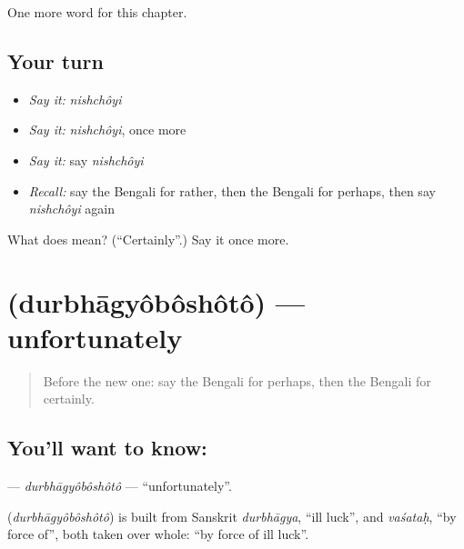 \begin{grammarlens}[title={What you've built}]
One more word for this chapter.
\end{grammarlens}

\subsection*{Your turn}
\begin{itemize}
\raggedright
  \item \emph{Say it:} \emph{nishchôyi}
  \item \emph{Say it:} \emph{nishchôyi}, once more
  \item \emph{Say it:} say \emph{nishchôyi}
  \item \emph{Recall:} say the Bengali for rather, then the Bengali for perhaps, then say \emph{nishchôyi} again
\end{itemize}

\begin{tcolorbox}[breakable,colback=teal!4,colframe=teal!35!black,title={Before you move on}]
What does  mean? (\textquotedblleft{}Certainly\textquotedblright{}.) Say it once more.
\end{tcolorbox}
\section[\texorpdfstring{\bn{দুর্ভাগ্যবশত} (durbhāgyôbôshôtô)}{দুর্ভাগ্যবশত (durbhāgyôbôshôtô)}]{ (durbhāgyôbôshôtô) — unfortunately}

\label{lesson:BN-C190-durbhagyoboshoto}



\begin{quote}
Before the new one: say the Bengali for perhaps, then the Bengali for certainly.
\end{quote}

\subsection*{You'll want to know: }
\textbf{} — \emph{durbhāgyôbôshôtô} — \textquotedblleft{}unfortunately\textquotedblright{}.

\begin{cousinweb}
\textbf{} (\emph{durbhāgyôbôshôtô}) is built from Sanskrit \emph{durbhāgya}, \textquotedblleft{}ill luck\textquotedblright{}, and \emph{vaśataḥ}, \textquotedblleft{}by force of\textquotedblright{}, both taken over whole: \textquotedblleft{}by force of ill luck\textquotedblright{}.
\end{cousinweb}

